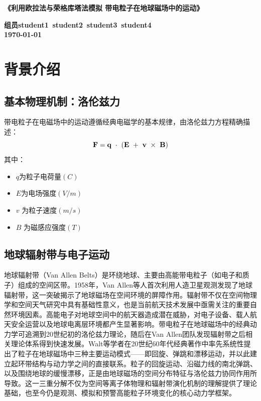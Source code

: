 \documentclass[11pt]{article}
\begin{document}

\begin{center}
    \LARGE \bf 《利用欧拉法与荣格库塔法模拟
带电粒子在地球磁场中的运动》
\end{center}




\begin{center}
    \Large \bf 组员\qquad student1\, student2\, student3\, student4\\
    \Large \bf {\today}
\end{center}
\section{背景介绍}


    \subsection{基本物理机制：洛伦兹力}
    带电粒子在电磁场中的运动遵循经典电磁学的基本规律，由洛伦兹力方程精确描述：
    \begin{equation}
        \bf{F}=q\ \cdot\ (E\ + \ \bf{v}\ \times \ \bf{B})\label{1}
    \end{equation}
    其中：
    \begin{itemize}
        \item $q$为粒子电荷量$(C)$
        \item $E$为电场强度$(V/m)$
        \item $v$ 为粒子速度$(m/s)$
        \item $B$ 为磁感应强度$(T)$
    \end{itemize}
    \subsection{地球辐射带与电子运动} 
    地球辐射带（Van Allen Belts）是环绕地球、主要由高能带电粒子（如电子和质子）组成的空间区带。1958年，Van Allen等人首次利用人造卫星观测发现了地球辐射带，这一突破揭示了地球磁场在空间环境的屏障作用。辐射带不仅在空间物理学和空间天气研究中具有基础性意义，也是当前航天技术发展中亟需关注的重要自然环境因素。高能电子对地球空间中的航天器造成潜在威胁，对电子设备、载人航天安全运营以及地球电离层环境都产生显著影响。带电粒子在地球磁场中的经典动力学可追溯到20世纪初的洛伦兹力理论，随后在Van Allen团队发现辐射带之后相关理论体系得到快速发展。Walt等学者在20世纪60年代经典著作中率先系统性提出了粒子在地球磁场中三种主要运动模式——即回旋、弹跳和漂移运动，并以此建立起环带结构与动力学之间的直接联系。粒子的回旋运动、沿磁力线的南北弹跳、以及围绕地球的缓慢漂移，正是由地球磁场的空间分布特征与洛伦兹力协同作用所导致。这一三重分解不仅为空间等离子体物理和辐射带演化机制的理解提供了理论基础，也至今仍是观测、模拟和预警高能粒子环境变化的核心动力学框架。
\end{document}
